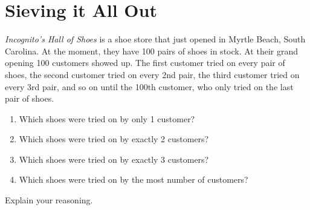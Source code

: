\newpage
\section{Sieving it All Out}\label{A:Sie}

\begin{prob}
\textit{Incognito's Hall of Shoes} is a shoe store that just
  opened in Myrtle Beach, South Carolina. At the moment, they have 100
  pairs of shoes in stock. At their grand opening 100 customers showed
  up. The first customer tried on every pair of shoes, the second
  customer tried on every 2nd pair, the third customer tried on every
  3rd pair, and so on until the 100th customer, who only tried on the
  last pair of shoes.
\begin{enumerate}
\item Which shoes were tried on by only 1 customer?
\item Which shoes were tried on by exactly 2 customers?
\item Which shoes were tried on by exactly 3 customers?
\item Which shoes were tried on by the most number of customers?
\end{enumerate}
Explain your reasoning.
\end{prob}

\newpage


